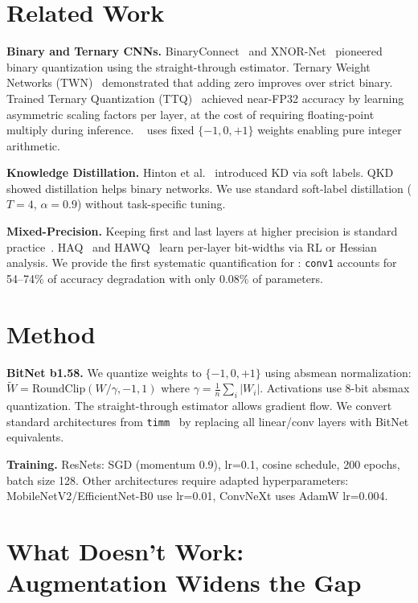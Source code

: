 \documentclass[10pt]{article}
\begin{document}
\section{Related Work}

\textbf{Binary and Ternary CNNs.} BinaryConnect~\cite{courbariaux2015binaryconnect} and XNOR-Net~\cite{rastegari2016xnornet} pioneered binary quantization using the straight-through estimator. Ternary Weight Networks (TWN)~\cite{li2016ternary} demonstrated that adding zero improves over strict binary. Trained Ternary Quantization (TTQ)~\cite{zhu2017ttq} achieved near-FP32 accuracy by learning asymmetric scaling factors per layer, at the cost of requiring floating-point multiply during inference. \bitnetb{}~\cite{ma2024bitnetb158} uses fixed $\{-1,0,+1\}$ weights enabling pure integer arithmetic.

\textbf{Knowledge Distillation.} Hinton et al.~\cite{hinton2015distilling} introduced KD via soft labels. QKD~\cite{kim2019qkd} showed distillation helps binary networks. We use standard soft-label distillation ($T=4$, $\alpha=0.9$) without task-specific tuning.

\textbf{Mixed-Precision.} Keeping first and last layers at higher precision is standard practice~\cite{rastegari2016xnornet,zhou2016dorefa}. HAQ~\cite{wang2019haq} and HAWQ~\cite{dong2019hawq,dong2020hawqv2} learn per-layer bit-widths via RL or Hessian analysis. We provide the first systematic quantification for \bitnetb{}: \texttt{conv1} accounts for 54--74\% of accuracy degradation with only 0.08\% of parameters.

\section{Method}

\textbf{BitNet b1.58.} We quantize weights to $\{-1,0,+1\}$ using absmean normalization: $\tilde{W} = \text{RoundClip}(W/\gamma, -1, 1)$ where $\gamma = \frac{1}{n}\sum_i|W_i|$. Activations use 8-bit absmax quantization. The straight-through estimator allows gradient flow. We convert standard architectures from \texttt{timm}~\cite{rw2019timm} by replacing all linear/conv layers with BitNet equivalents.

\textbf{Training.} ResNets: SGD (momentum 0.9), lr=0.1, cosine schedule, 200 epochs, batch size 128. Other architectures require adapted hyperparameters: MobileNetV2/EfficientNet-B0 use lr=0.01, ConvNeXt uses AdamW lr=0.004.

\section{What Doesn't Work: Augmentation Widens the Gap}
\end{document}
